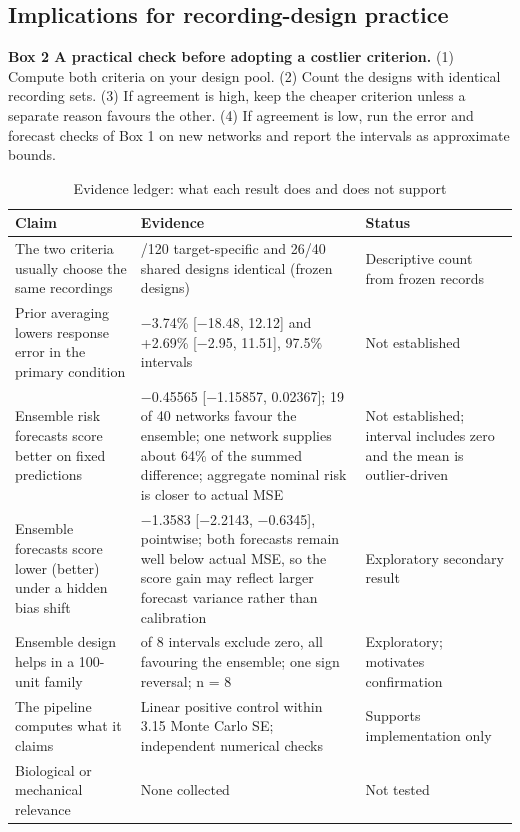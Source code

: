 \subsection{Implications for recording-design practice}

\textbf{Box 2 \textbar{} A practical check before adopting a costlier criterion.} (1) Compute both criteria on your design pool. (2) Count the designs with identical recording sets. (3) If agreement is high, keep the cheaper criterion unless a separate reason favours the other. (4) If agreement is low, run the error and forecast checks of Box 1 on new networks and report the intervals as approximate bounds.

\begin{table}[!t]
\setcounter{table}{1}
\caption{Evidence ledger: what each result does and does not support}
\label{tab:2}
\centering\small
\setlength{\tblw}{\dimexpr\textwidth-6\tabcolsep\relax}
\begin{tabular}{>{\raggedright\arraybackslash}p{0.1789\tblw}>{\raggedright\arraybackslash}p{0.4786\tblw}>{\raggedright\arraybackslash}p{0.3425\tblw}}
\toprule
Claim & Evidence & Status \\
\midrule
The two criteria usually choose the same recordings & 82/120 target-specific and 26/40 shared designs identical (frozen designs) & Descriptive count from frozen records \\
Prior averaging lowers response error in the primary condition & −3.74\% {[}−18.48, 12.12{]} and +2.69\% {[}−2.95, 11.51{]}, 97.5\% intervals & Not established \\
Ensemble risk forecasts score better on fixed predictions & −0.45565 {[}−1.15857, 0.02367{]}; 19 of 40 networks favour the ensemble; one network supplies about 64\% of the summed difference; aggregate nominal risk is closer to actual MSE & Not established; interval includes zero and the mean is outlier-driven \\
Ensemble forecasts score lower (better) under a hidden bias shift & −1.3583 {[}−2.2143, −0.6345{]}, pointwise; both forecasts remain well below actual MSE, so the score gain may reflect larger forecast variance rather than calibration & Exploratory secondary result \\
Ensemble design helps in a 100-unit family & 4 of 8 intervals exclude zero, all favouring the ensemble; one sign reversal; n = 8 & Exploratory; motivates confirmation \\
The pipeline computes what it claims & Linear positive control within 3.15 Monte Carlo SE; independent numerical checks & Supports implementation only \\
Biological or mechanical relevance & None collected & Not tested \\
\bottomrule
\end{tabular}
\end{table}

